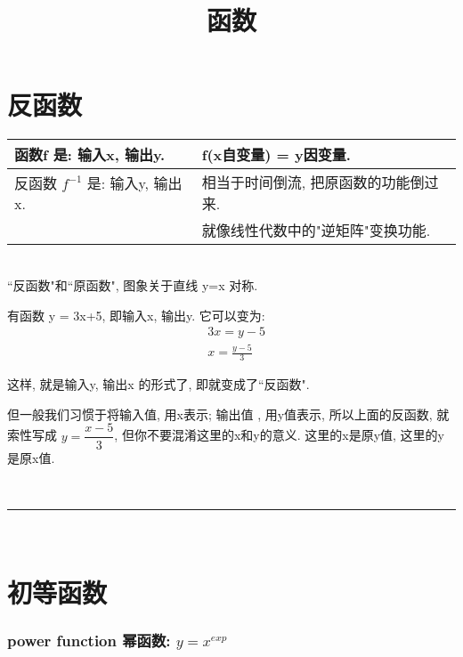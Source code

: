 \documentclass[UTF8]{ctexart}
\title{函数}
\begin{document}
	\tableofcontents %
	\date{} %
	\maketitle  %

\part{反函数}



\begin{tabular}{|l| l| }
	\hline
	函数f 是: 输入x, 输出y.
	 &  f(x自变量) = y因变量. \\	 
	\hline	
	
	反函数 $f^{-1}$ 是: 输入y, 输出x. 
	&  相当于时间倒流, 把原函数的功能倒过来.  \\
	& 就像线性代数中的"逆矩阵"变换功能. \\
	\hline
\end{tabular}
\\

``反函数"和``原函数", 图象关于直线 y=x 对称. \\


\begin{myEnvSample}
有函数 y = 3x+5, 即输入x, 输出y. 它可以变为: 
	\begin{align*}
		& 3x = y-5 \\
		& x = \frac{y-5} {3} 
	\end{align*}
	
	这样, 就是输入y, 输出x 的形式了, 即就变成了``反函数".
	
	但一般我们习惯于将输入值, 用x表示; 输出值 , 用y值表示, 所以上面的反函数, 就索性写成  $ y = \dfrac{x-5} {3} $, 但你不要混淆这里的x和y的意义. 这里的x是原y值, 这里的y是原x值.
\end{myEnvSample}



~\\
\hrule
~\\


\part{初等函数}

\section{power function 幂函数:  $ y = x^{exp} $}
\end{document}
